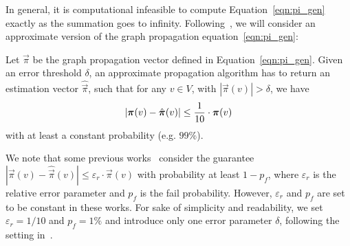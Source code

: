 In general, it is computational infeasible to compute Equation~\eqref{eqn:pi_gen}
exactly as the summation goes to infinity. Following~\cite{bressan2018sublinear,wang2020RBS},   we will consider an approximate  version of the graph propagation equation~\eqref{eqn:pi_gen}:
\begin{definition}\label{def:pro-relative}
	Let $\vec{\pi}$ be the graph propagation vector defined in Equation~\eqref{eqn:pi_gen}.
	Given an error threshold $\delta$, an approximate propagation algorithm has to return an estimation vector $\hat{\vec{\pi}}$, such that  for any $v \in V$, with  $|\vec{\pi}(v)|>\delta$, we have 
	\vspace{-2mm}
	\begin{align}\nonumber
	\vspace{-2mm}
	\left|\vec{\pi}(v)-\hat{\vec{\pi}}(v)\right| \leq \frac{1}{10} \cdot \vec{\pi}(v)
	\end{align}
	 with at least a constant probability (e.g. $99\%$).
\end{definition}
We note that some previous works~\cite{yang2019TEA,Wang2017FORA} consider the guarantee $\left|\vec{\pi}(v)-\hat{\vec{\pi}}(v)\right| \leq \varepsilon_r \cdot \vec{\pi}(v)$ with probability at least $1-p_f$, where $\varepsilon_r$ is the relative error parameter and $p_f$ is the fail probability.  However, $\varepsilon_r$ and $p_f$ are set to be constant in these works. For sake of simplicity and readability, we set $\varepsilon_r = 1/10$ and $p_f = 1\%$ and introduce only one error parameter $\delta$, following the setting in~\cite{bressan2018sublinear,wang2020RBS}.






